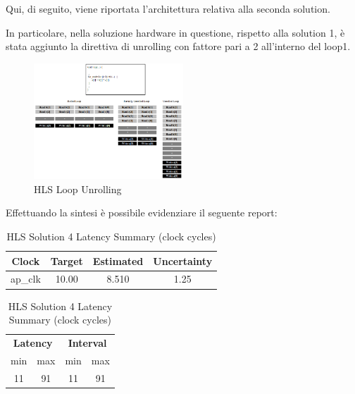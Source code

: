 Qui, di seguito, viene riportata l'architettura relativa alla seconda solution.



In particolare, nella soluzione hardware in questione, rispetto alla solution 1, è stata aggiunto la direttiva di unrolling con fattore pari a 2 all'interno del loop1.

\begin{figure}[H]
	\centering
	\includegraphics[width=0.5\textwidth]{solutions/s4/unrolling.png}
	\caption{HLS Loop Unrolling}
\end{figure}

Effettuando la sintesi è possibile evidenziare il seguente report:\\

\begin{table}[H]
	\centering
	\begin{minipage}[t]{0.45\linewidth}
		\centering
		\begin{tabular}{|c|c|c|c|}
			\hline
			\textbf{Clock} & \textbf{Target} & \textbf{Estimated} & \textbf{Uncertainty} \\
			\hline
			ap\_clk & 10.00 & 8.510 & 1.25 \\
			\hline
		\end{tabular}
		\caption{HLS Solution 4 Timing Summary (ns)}
		\label{tab:hls-solution-4-timing-summary}
	\end{minipage}
	\hfill
	\begin{minipage}[t]{0.45\linewidth}
		\centering
		\begin{tabular}{|c|c|c|c|}
			\hline
			\multicolumn{2}{|c|}{\textbf{Latency}} & \multicolumn{2}{|c|}{\textbf{Interval}} \\
			min & max & min & max \\
			\hline
			11 & 91 & 11 & 91 \\
			\hline
		\end{tabular}
		\caption{HLS Solution 4 Latency Summary (clock cycles)}
		\label{tab:hls-solution-4-latency-summary}
	\end{minipage}
\end{table}

